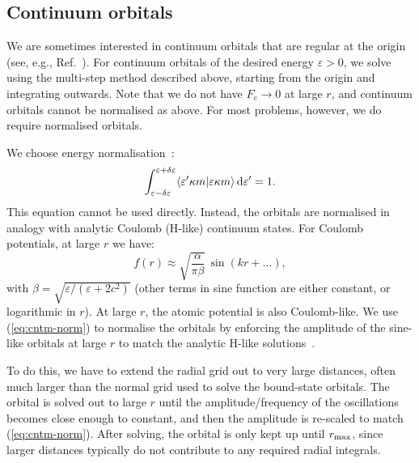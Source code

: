 \documentclass[10pt,twocolumn,a4paper]{article}%
\newcommand{\braket}[1]{\ensuremath{\langle #1\rangle}}	%
\newcommand{\be}{\begin{equation}}
\newcommand{\ee}{\end{equation}}
\def\d{\ensuremath{{\rm d}}}
\def\en{\ensuremath{\varepsilon}}
\renewcommand{\k}{\ensuremath{\kappa}}
\begin{document}
\subsection{Continuum orbitals}

We are sometimes interested in continuum orbitals that are regular at the origin (see, e.g., Ref.~\cite{BetheBook}).
For continuum orbitals of the desired energy $\en>0$, we solve using the multi-step method described above, starting from the origin and integrating outwards.
Note that we do not have $F_c\to0$ at large $r$, and continuum orbitals cannot be normalised as above.
For most problems, however, we do require normalised orbitals.

We choose energy normalisation~\cite{BetheBook}:
\be
\int_{\en-\delta\en}^{\en+\delta\en}\braket{\en' \k m|\en \k m}\,\d\en' = 1.
\ee
This equation cannot be used directly.
Instead, the orbitals are normalised in analogy with analytic Coulomb (H-like) continuum states.
For Coulomb potentials, at large $r$ we have:
\be\label{eq:cntm-norm}
f(r) \approx \sqrt{\frac{\alpha}{\pi \beta}}\,\sin(kr + \ldots),
\ee
with
$
\beta = \sqrt{{\en}/({\en + 2c^2})}
$
(other terms in sine function are either constant, or logarithmic in $r$).
At large $r$, the atomic potential is also Coulomb-like.
We use (\ref{eq:cntm-norm}) to normalise the orbitals by enforcing the amplitude of the sine-like orbitals at large $r$ to match the analytic H-like solutions~\cite{BetheBook}.

To do this, we have to extend the radial grid out to very large distances, often much larger than the normal grid used to solve the bound-state orbitals.
The orbital is solved out to large $r$ until the amplitude/frequency of the oscillations becomes close enough to constant, and then the amplitude is re-scaled to match (\ref{eq:cntm-norm}).
After solving, the orbital is only kept up until $r_{\rm max}$, since larger distances typically do not contribute to any required radial integrals. 


\end{document}
